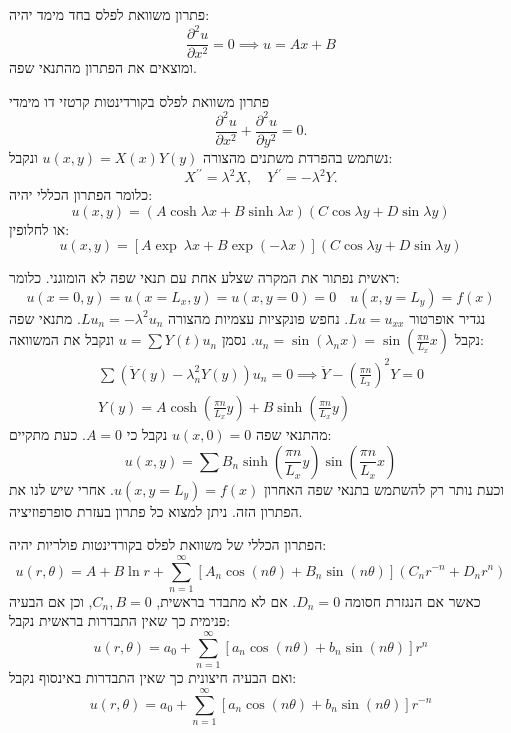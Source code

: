 \documentclass{tstextbook}
\begin{document}
\begin{proposition}
פתרון משוואת לפלס בחד מימד יהיה:
$$\frac{\partial^2 u}{\partial x^2} =0\implies u=Ax+B$$
ומוצאים את הפתרון מהתנאי שפה.

\end{proposition}
\begin{proposition}
פתרון משוואת לפלס בקורדינטות קרטזי דו מימדי
$$ \frac{\partial^2u}{\partial x^2}+\frac{\partial^2u}{\partial y^2}=0.$$
נשתמש בהפרדת משתנים מהצורה \(u(x,y)=X(x)Y(y)\) ונקבל:
$$ X^{\prime\prime}=\lambda^2X,\quad Y^{\prime\prime}=-\lambda^2Y.$$
כלומר הפתרון הכללי יהיה:
$$ u(x,y)=(A\cosh\lambda x+B\sinh\lambda x)(C\cos\lambda y+D\sin\lambda y)$$
או לחלופין:
$$ u(x,y)=[A\exp\:\lambda x+B\exp(-\lambda x)](C\cos\lambda y+D\sin\lambda y)$$

\end{proposition}
\begin{example}
ראשית נפתור את המקרה שצלע אחת עם תנאי שפה לא הומוגני. כלומר:
$$u(x=0,y)=u(x=L_{x},y)=u(x,y=0)=0\quad u(x,y=L_{y})=f(x)$$
נגדיר אופרטור \(Lu=u_{x x}\). נחפש פונקציות עצמיות מהצורה \(Lu_{n}=-\lambda^2u_{n}\). מתנאי שפה נקבל \(u_{n}=\sin \left( \lambda_{n} x \right)=\sin\left( \frac{\pi n}{L_{x}}x \right)\). נסמן \(u=\sum Y(t)u_{n}\) ונקבל את המשוואה:
$$\begin{gather}\sum \left( \ddot{Y}(y) - \lambda_{n}^2Y(y) \right) u_{n} = 0\implies  \ddot{Y}- \left( \frac{\pi n}{L_{x}} \right)^2Y=0 \\Y(y)=A\cosh\left( \frac{\pi n}{L_{x}}y \right)+B\sinh\left( \frac{\pi n}{L_{x}}y \right)
\end{gather}$$
מהתנאי שפה \(u(x,0)=0\) נקבל כי \(A=0\). כעת מתקיים:
$$u(x,y)=\sum B_{n}\sinh\left( \frac{\pi n}{L_{x}}y \right)\sin\left( \frac{\pi n}{L_{x}}x \right)$$
וכעת נותר רק להשתמש בתנאי שפה האחרון \(u(x,y=L_{y})=f(x)\).
אחרי שיש לנו את הפתרון הזה. ניתן למצוא כל פתרון בעזרת סופרפוזיציה.

\end{example}
\begin{proposition}
הפתרון הכללי של משוואת לפלס בקורדינטות פולריות יהיה:
$$\!\!\!u(r,\theta)\!=\!A\!+\!B\ln r\!+\!\sum_{n=1}^\infty\left[A_n\cos(n\theta)\!+\!B_n\sin(n\theta)\right](C_{n}r^{-n}\!+\!D_{n}r^n)$$
כאשר אם הנגזרת חסומה \(D_{n}=0\). אם לא מתבדר בראשית, \(C_{n},B=0\), וכן אם הבעיה פנימית כך שאין התבדרות בראשית נקבל:
$$ u(r,\theta)=a_0+\sum_{n=1}^{\infty}\left[a_n\cos(n\theta)+b_n\sin(n\theta)\right]r^{n}$$
ואם הבעיה חיצונית כך שאין התבדרות באינסוף נקבל:
$$ u(r,\theta)=a_0+\sum_{n=1}^{\infty}\left[a_n\cos(n\theta)+b_n\sin(n\theta)\right]r^{-n}$$

\end{proposition}
\end{document}
